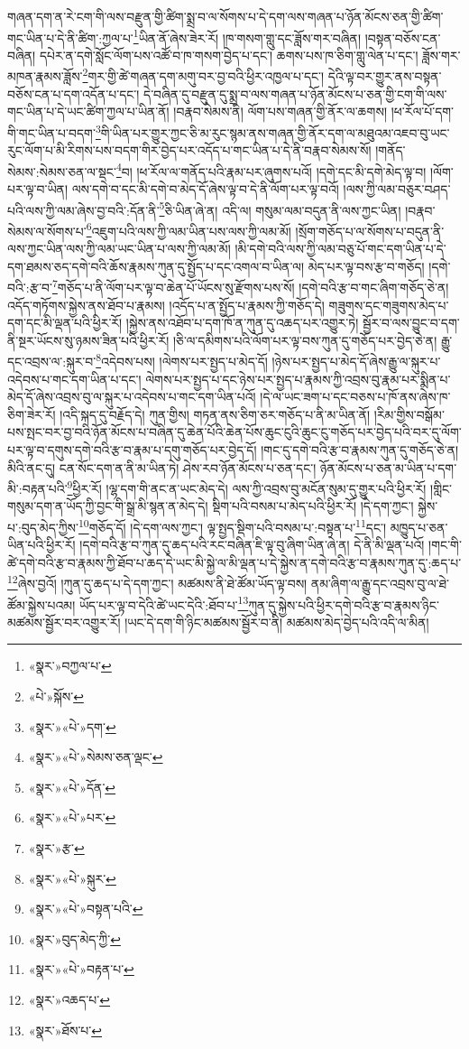 གཞན་དག་ན་རེ་ངག་གི་ལས་བརྫུན་གྱི་ཚིག་སྨྲ་བ་ལ་སོགས་པ་དེ་དག་ལས་གཞན་པ་ཉོན་མོངས་ཅན་གྱི་ཚིག་གང་ཡིན་པ་དེ་ནི་ཚིག་:ཀྱལ་པ་\footnote{«སྣར་»བཀྱལ་པ་}ཡིན་ནོ་ཞེས་ཟེར་རོ། །ཁ་གསག་གླུ་དང་ཟློས་གར་བཞིན། །བསྟན་བཅོས་ངན་བཞིན། དཔེར་ན་དགེ་སློང་ལོག་པས་འཚོ་བ་ཁ་གསག་བྱེད་པ་དང་། ཆགས་པས་ཁ་ཅིག་གླུ་ལེན་པ་དང་། ཟློས་གར་མཁན་རྣམས་ཟློས་\footnote{«པེ་»སྐོས་}གར་གྱི་ཚེ་གཞན་དག་མགུ་བར་བྱ་བའི་ཕྱིར་འཁྱལ་པ་དང་། དེའི་ལྟ་བར་གྱུར་ནས་བསྟན་བཅོས་ངན་པ་དག་འདོན་པ་དང་། དེ་བཞིན་དུ་བརྫུན་དུ་སྨྲ་བ་ལས་གཞན་པ་ཉོན་མོངས་པ་ཅན་གྱི་ངག་གི་ལས་གང་ཡིན་པ་དེ་ཡང་ཚིག་ཀྱལ་པ་ཡིན་ནོ། །བརྣབ་སེམས་ནི། ལོག་པས་གཞན་གྱི་ནོར་ལ་ཆགས། །ཕ་རོལ་པོ་དག་གི་གང་ཡིན་པ་བདག་\footnote{«སྣར་»«པེ་»དག་}གི་ཡིན་པར་གྱུར་ཀྱང་ཅི་མ་རུང་སྙམ་ནས་གཞན་གྱི་ནོར་དག་ལ་མཐུའམ་འཇབ་བུ་ཡང་རུང་ལོག་པ་མི་རིགས་པས་བདག་གིར་བྱེད་པར་འདོད་པ་གང་ཡིན་པ་དེ་ནི་བརྣབ་སེམས་སོ། །གནོད་སེམས་:སེམས་ཅན་ལ་སྡང་\footnote{«སྣར་»«པེ་»སེམས་ཅན་ལྡང་}བ། །ཕ་རོལ་ལ་གནོད་པའི་རྣམ་པར་ཞུགས་པའོ། །དགེ་དང་མི་དགེ་མེད་ལྟ་བ། །ལོག་པར་ལྟ་བ་ཡིན། ལས་དགེ་བ་དང་མི་དགེ་བ་མེད་དོ་ཞེས་ལྟ་བ་དེ་ནི་ལོག་པར་ལྟ་བའོ། །ལས་ཀྱི་ལམ་བཅུར་བཤད་པའི་ལས་ཀྱི་ལམ་ཞེས་བྱ་བའི་:དོན་ནི་\footnote{«སྣར་»«པེ་»དོན་}ཅི་ཡིན་ཞེ་ན། འདི་ལ། གསུམ་ལམ་བདུན་ནི་ལས་ཀྱང་ཡིན། །བརྣབ་སེམས་ལ་སོགས་པ་\footnote{«སྣར་»«པེ་»པར་}འཇུག་པའི་ལས་ཀྱི་ལམ་ཡིན་པས་ལས་ཀྱི་ལམ་མོ། །སྲོག་གཅོད་པ་ལ་སོགས་པ་བདུན་ནི་ལས་ཀྱང་ཡིན་ལས་ཀྱི་ལམ་ཡང་ཡིན་པ་ལས་ཀྱི་ལམ་མོ། །མི་དགེ་བའི་ལས་ཀྱི་ལམ་བཅུ་པོ་གང་དག་ཡིན་པ་དེ་དག་ཐམས་ཅད་དགེ་བའི་ཆོས་རྣམས་ཀུན་དུ་སྤྱོད་པ་དང་འགལ་བ་ཡིན་ལ། མེད་པར་ལྟ་བས་རྩ་བ་གཅོད། །དགེ་བའི་:རྩ་བ་\footnote{«སྣར་»རྩ་}གཅོད་པ་ནི་ལོག་པར་ལྟ་བ་ཆེན་པོ་ཡོངས་སུ་རྫོགས་པས་སོ། །དགེ་བའི་རྩ་བ་གང་ཞིག་གཅོད་ཅེ་ན། འདོད་གཏོགས་སྐྱེས་ནས་ཐོབ་པ་རྣམས། །འདོད་པ་ན་སྤྱོད་པ་རྣམས་ཀྱི་གཅོད་དེ། གཟུགས་དང་གཟུགས་མེད་པ་དག་དང་མི་ལྡན་པའི་ཕྱིར་རོ། །སྐྱེས་ནས་འཐོབ་པ་དག་ཁོ་ན་ཀུན་དུ་འཆད་པར་འགྱུར་ཏེ། སྦྱོར་བ་ལས་བྱུང་བ་དག་ནི་སྔར་ཡོངས་སུ་ཉམས་ཟིན་པའི་ཕྱིར་རོ། །ཅི་ལ་དམིགས་པའི་ལོག་པར་ལྟ་བས་ཀུན་དུ་གཅོད་པར་བྱེད་ཅེ་ན། རྒྱུ་དང་འབྲས་ལ་:སྐུར་བ་\footnote{«སྣར་»«པེ་»སྐུར་}འདེབས་པས། །ལེགས་པར་སྤྱད་པ་མེད་དོ། །ཉེས་པར་སྤྱད་པ་མེད་དོ་ཞེས་རྒྱུ་ལ་སྐུར་པ་འདེབས་པ་གང་དག་ཡིན་པ་དང་། ལེགས་པར་སྤྱད་པ་དང་ཉེས་པར་སྤྱད་པ་རྣམས་ཀྱི་འབྲས་བུ་རྣམ་པར་སྨིན་པ་མེད་དོ་ཞེས་འབྲས་བུ་ལ་སྐུར་པ་འདེབས་པ་གང་དག་ཡིན་པའོ། །དེ་ལ་ཡང་ཟག་པ་དང་བཅས་པ་ཁོ་ནས་ཞེས་ཁ་ཅིག་ཟེར་རོ། །འདི་སྐད་དུ་བརྗོད་དེ། ཀུན་གྱིས། གཏན་ནས་ཅིག་ཅར་གཅོད་པ་ནི་མ་ཡིན་ནོ། །རིམ་གྱིས་བསྒོམ་པས་སྤང་བར་བྱ་བའི་ཉོན་མོངས་པ་བཞིན་དུ་ཆེན་པོའི་ཆེན་པོས་ཆུང་ངུའི་ཆུང་ངུ་གཅོད་པར་བྱེད་པའི་བར་དུ་ལོག་པར་ལྟ་བ་དགུས་དགེ་བའི་རྩ་བ་རྣམ་པ་དགུ་གཅོད་པར་བྱེད་དོ། །གང་དུ་དགེ་བའི་རྩ་བ་རྣམས་ཀུན་དུ་གཅོད་ཅེ་ན། མིའི་ནང་དུ། ངན་སོང་དག་ན་ནི་མ་ཡིན་ཏེ། ཤེས་རབ་ཉོན་མོངས་པ་ཅན་དང་། ཉོན་མོངས་པ་ཅན་མ་ཡིན་པ་དག་མི་:བརྟན་པའི་\footnote{«སྣར་»«པེ་»བསྟན་པའི་}ཕྱིར་རོ། །ལྷ་དག་གི་ནང་ན་ཡང་མེད་དེ། ལས་ཀྱི་འབྲས་བུ་མངོན་སུམ་དུ་གྱུར་པའི་ཕྱིར་རོ། །གླིང་གསུམ་དག་ན་ཡོད་ཀྱི་བྱང་གི་སྒྲ་མི་སྙན་ན་མེད་དེ། སྡིག་པའི་བསམ་པ་མེད་པའི་ཕྱིར་རོ། །དེ་དག་ཀྱང་། སྐྱེས་པ་:བུད་མེད་ཀྱིས་\footnote{«སྣར་»བུད་མེད་ཀྱི་}གཅོད་དོ། །དེ་དག་ལས་ཀྱང་། ལྟ་སྤྱད་སྡིག་པའི་བསམ་པ་:བསྟན་པ་\footnote{«སྣར་»«པེ་»བརྟན་པ་}དང་། མཁྱུད་པ་ཅན་ཡིན་པའི་ཕྱིར་རོ། །དགེ་བའི་རྩ་བ་ཀུན་དུ་ཆད་པའི་རང་བཞིན་ཇི་ལྟ་བུ་ཞིག་ཡིན་ཞེ་ན། དེ་ནི་མི་ལྡན་པའོ། །གང་གི་ཚེ་དགེ་བའི་རྩ་བ་རྣམས་ཀྱི་ཐོབ་པ་ཆད་དེ་ཡང་མི་སྐྱེ་ལ་མི་ལྡན་པ་དེ་སྐྱེས་ན་དགེ་བའི་རྩ་བ་རྣམས་ཀུན་དུ་:ཆད་པ་\footnote{«སྣར་»འཆད་པ་}ཞེས་བྱའོ། །ཀུན་དུ་ཆད་པ་དེ་དག་ཀྱང་། མཚམས་ནི་ཐེ་ཚོམ་ཡོད་ལྟ་བས། ནམ་ཞིག་ལ་རྒྱུ་དང་འབྲས་བུ་ལ་ཐེ་ཚོམ་སྐྱེས་པའམ། ཡོད་པར་ལྟ་བ་དེའི་ཚེ་ཡང་དེའི་:ཐོབ་པ་\footnote{«སྣར་»ཐོས་པ་}ཀུན་དུ་སྐྱེས་པའི་ཕྱིར་དགེ་བའི་རྩ་བ་རྣམས་ཉིང་མཚམས་སྦྱོར་བར་འགྱུར་རོ། །ཡང་དེ་དག་གི་ཉིང་མཚམས་སྦྱོར་བ་ནི། མཚམས་མེད་བྱེད་པའི་འདི་ལ་མིན། 